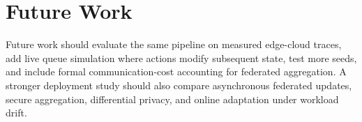 \section{Future Work}
\label{sec:future_work}

Future work should evaluate the same pipeline on measured edge-cloud traces, add live queue simulation where actions modify subsequent state, test more seeds, and include formal communication-cost accounting for federated aggregation. A stronger deployment study should also compare asynchronous federated updates, secure aggregation, differential privacy, and online adaptation under workload drift.
